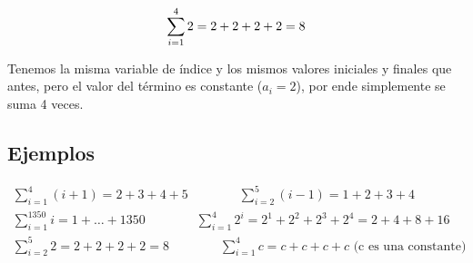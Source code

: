 \begin{equation}
  \sum_{i=1}^4{2}=2+2+2+2=8\\
\end{equation}

Tenemos la misma variable de índice y los mismos valores iniciales y finales que antes, pero el valor del término es constante ($a_i=2$), por ende simplemente se suma 4 veces. 

\subsection{Ejemplos}

\begin{gather*}
\sum_{i=1}^4{(i+1)}=2+3+4+5 \hspace{4em} \sum_{i=2}^5{(i-1)}=1+2+3+4 \\
\sum_{i=1}^{1350}{i}=1+\dots+1350  \hspace{4em} \sum_{i=1}^4{2^i}=2^1+2^2+2^3+2^4=2+4+8+16 \\
\sum_{i=2}^5{2}=2+2+2+2=8 \hspace{4em}  \sum_{i=1}^4{c}=c+c+c+c \text{ (c es una constante)}
\end{gather*}
